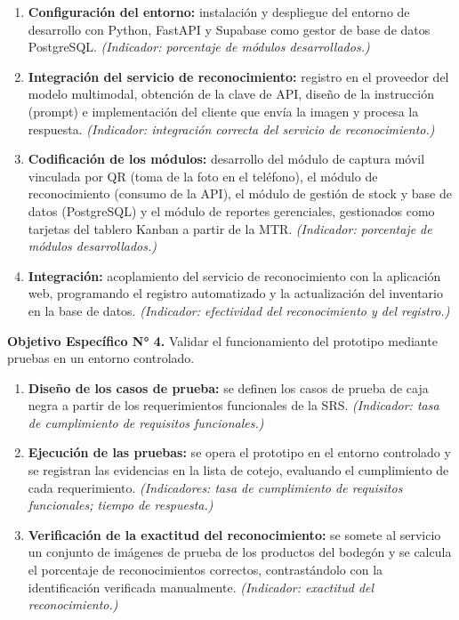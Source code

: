 \documentclass[12pt, letterpaper]{report}
\begin{document}
\begin{enumerate}
  \item \textbf{Configuración del entorno:} instalación y despliegue del
        entorno de desarrollo con Python, FastAPI y Supabase como gestor de base de
        datos PostgreSQL. \textit{(Indicador: porcentaje de módulos
        desarrollados.)}

  \item \textbf{Integración del servicio de reconocimiento:} registro
        en el proveedor del modelo multimodal, obtención de la clave de
        API, diseño de la instrucción (prompt) e implementación del
        cliente que envía la imagen y procesa la respuesta.
        \textit{(Indicador: integración correcta del servicio de
        reconocimiento.)}

  \item \textbf{Codificación de los módulos:} desarrollo del módulo de
        captura móvil vinculada por QR (toma de la foto en el
        teléfono), el módulo de reconocimiento (consumo de la API), el módulo de gestión de
        stock y base de datos (PostgreSQL) y el módulo de reportes
        gerenciales, gestionados como tarjetas del tablero Kanban a
        partir de la MTR. \textit{(Indicador: porcentaje de módulos
        desarrollados.)}

  \item \textbf{Integración:} acoplamiento del servicio de
        reconocimiento con la aplicación web, programando el registro
        automatizado y la actualización del inventario en la base de
        datos. \textit{(Indicador: efectividad del reconocimiento y del
        registro.)}
\end{enumerate}

\noindent\textbf{Objetivo Específico N° 4.} Validar el funcionamiento
del prototipo mediante pruebas en un entorno controlado.

\begin{enumerate}
  \item \textbf{Diseño de los casos de prueba:} se definen los casos de
        prueba de caja negra a partir de los requerimientos funcionales
        de la SRS. \textit{(Indicador: tasa de cumplimiento de
        requisitos funcionales.)}

  \item \textbf{Ejecución de las pruebas:} se opera el prototipo en el
        entorno controlado y se registran las evidencias en la lista de
        cotejo, evaluando el cumplimiento de cada requerimiento.
        \textit{(Indicadores: tasa de cumplimiento de requisitos
        funcionales; tiempo de respuesta.)}

  \item \textbf{Verificación de la exactitud del reconocimiento:} se
        somete al servicio un conjunto de imágenes de prueba de los
        productos del bodegón y se calcula el porcentaje de
        reconocimientos correctos, contrastándolo con la identificación
        verificada manualmente. \textit{(Indicador: exactitud del
        reconocimiento.)}
\end{enumerate}
\end{document}
